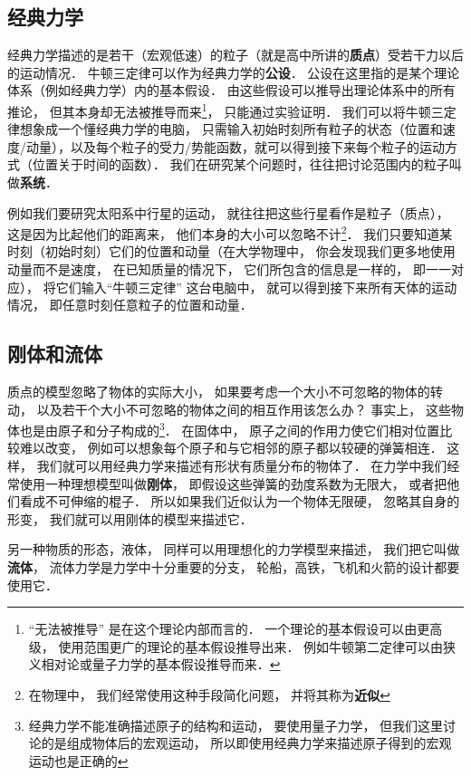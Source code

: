 

\subsection{经典力学}
经典力学描述的是若干（宏观低速）的粒子（就是高中所讲的\textbf{质点}）受若干力以后的运动情况． 牛顿三定律可以作为经典力学的\textbf{公设}． 公设在这里指的是某个理论体系（例如经典力学）内的基本假设． 由这些假设可以推导出理论体系中的所有推论， 但其本身却无法被推导而来\footnote{“无法被推导” 是在这个理论内部而言的． 一个理论的基本假设可以由更高级， 使用范围更广的理论的基本假设推导出来． 例如牛顿第二定律可以由狭义相对论或量子力学的基本假设推导而来．}， 只能通过实验证明． 我们可以将牛顿三定律想象成一个懂经典力学的电脑， 只需输入初始时刻所有粒子的状态（位置和速度/动量），以及每个粒子的受力/势能函数，就可以得到接下来每个粒子的运动方式（位置关于时间的函数）． 我们在研究某个问题时，往往把讨论范围内的粒子叫做\textbf{系统}．

例如我们要研究太阳系中行星的运动， 就往往把这些行星看作是粒子（质点）， 这是因为比起他们的距离来， 他们本身的大小可以忽略不计\footnote{在物理中， 我们经常使用这种手段简化问题， 并将其称为\textbf{近似}}． 我们只要知道某时刻（初始时刻）它们的位置和动量（在大学物理中， 你会发现我们更多地使用动量而不是速度， 在已知质量的情况下， 它们所包含的信息是一样的， 即一一对应）， 将它们输入“牛顿三定律” 这台电脑中， 就可以得到接下来所有天体的运动情况， 即任意时刻任意粒子的位置和动量．

\subsection{刚体和流体}
质点的模型忽略了物体的实际大小， 如果要考虑一个大小不可忽略的物体的转动， 以及若干个大小不可忽略的物体之间的相互作用该怎么办？ 事实上， 这些物体也是由原子和分子构成的\footnote{经典力学不能准确描述原子的结构和运动， 要使用量子力学， 但我们这里讨论的是组成物体后的宏观运动， 所以即使用经典力学来描述原子得到的宏观运动也是正确的}． 在固体中， 原子之间的作用力使它们相对位置比较难以改变， 例如可以想象每个原子和与它相邻的原子都以较硬的弹簧相连． 这样， 我们就可以用经典力学来描述有形状有质量分布的物体了． 在力学中我们经常使用一种理想模型叫做\textbf{刚体}， 即假设这些弹簧的劲度系数为无限大， 或者把他们看成不可伸缩的棍子． 所以如果我们近似认为一个物体无限硬， 忽略其自身的形变， 我们就可以用刚体的模型来描述它．

另一种物质的形态，液体， 同样可以用理想化的力学模型来描述， 我们把它叫做\textbf{流体}， 流体力学是力学中十分重要的分支， 轮船，高铁，飞机和火箭的设计都要使用它．

